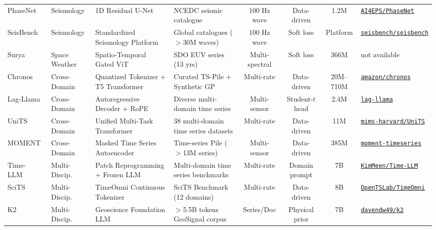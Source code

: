 \begin{table}[t]
{\begin{tabular}{@{}lp{2.0cm}p{3.0cm}p{3.4cm}cccp{3.0cm}@{}}
PhaseNet~\cite{zhu2019phasenet} & Seismology & 1D Residual U-Net & NCEDC seismic catalogue & $100\text{ Hz}$ wave & Data-driven & 1.2M & \href{https://github.com/AI4EPS/PhaseNet}{\texttt{AI4EPS/PhaseNet}} \\
SeisBench~\cite{woollam2022seisbench} & Seismology & Standardized Seismology Platform & Global catalogues ($>$30M waves) & $100\text{ Hz}$ wave & Soft loss & Platform & \href{https://github.com/seisbench/seisbench}{\texttt{seisbench/seisbench}} \\
Surya~\cite{roy2025surya} & Space Weather & Spatio-Temporal Gated ViT & SDO EUV series (13 yrs) & Multi-spectral & Soft loss & 366M & not available \\
Chronos~\cite{ansari2024chronos} & Cross-Domain & Quantized Tokenizer + T5 Transformer & Curated TS-Pile + Synthetic GP & Multi-rate & Data-driven & 20M--710M & \href{https://github.com/amazon-science/chronos-forecasting}{\texttt{amazon/chronos}} \\
Lag-Llama~\cite{rasul2024lagllama} & Cross-Domain & Autoregressive Decoder + RoPE & Diverse multi-domain time series & Multi-sensor & Student-$t$ head & 2.4M & \href{https://github.com/time-series-foundation-models/lag-llama}{\texttt{lag-llama}} \\
UniTS~\cite{gao2024units} & Cross-Domain & Unified Multi-Task Transformer & 38 multi-domain time series datasets & Multi-rate & Data-driven & 11M & \href{https://github.com/mims-harvard/UniTS}{\texttt{mims-harvard/UniTS}} \\
MOMENT~\cite{goswami2024moment} & Cross-Domain & Masked Time Series Autoencoder & Time-series Pile ($>$13M series) & Multi-sensor & Data-driven & 385M & \href{https://github.com/moment-timeseries-foundation-model/moment}{\texttt{moment-timeseries}} \\
Time-LLM~\cite{jin2024timellm} & Multi-Discip. & Patch Reprogramming + Frozen LLM & Multi-domain time series benchmarks & Multi-rate & Domain prompt & 7B & \href{https://github.com/KimMeen/Time-LLM}{\texttt{KimMeen/Time-LLM}} \\
SciTS~\cite{wu2025scits} & Multi-Discip. & TimeOmni Continuous Tokenizer & SciTS Benchmark (12 domains) & Multi-rate & Data-driven & 8B & \href{https://github.com/OpenTSLab/TimeOmni}{\texttt{OpenTSLab/TimeOmni}} \\
K2~\cite{deng2024k2} & Multi-Discip. & Geoscience Foundation LLM & $>$5.5B tokens GeoSignal corpus & Series/Doc & Physical prior & 7B & \href{https://github.com/davendw49/k2}{\texttt{davendw49/k2}} \\

\end{tabular}}
\end{table}
